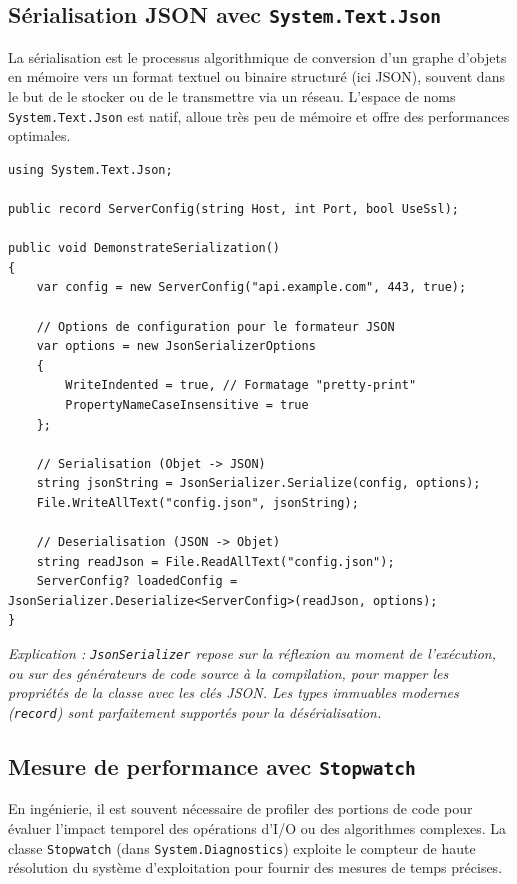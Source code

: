 \subsection{Sérialisation JSON avec \texttt{System.Text.Json}}

La sérialisation est le processus algorithmique de conversion d'un graphe d'objets en mémoire vers un format textuel ou binaire structuré (ici JSON), souvent dans le but de le stocker ou de le transmettre via un réseau. L'espace de noms \texttt{System.Text.Json} est natif, alloue très peu de mémoire et offre des performances optimales.

\begin{lstlisting}[language={[Sharp]C}]
using System.Text.Json;

public record ServerConfig(string Host, int Port, bool UseSsl);

public void DemonstrateSerialization()
{
    var config = new ServerConfig("api.example.com", 443, true);

    // Options de configuration pour le formateur JSON
    var options = new JsonSerializerOptions 
    { 
        WriteIndented = true, // Formatage "pretty-print"
        PropertyNameCaseInsensitive = true
    };

    // Serialisation (Objet -> JSON)
    string jsonString = JsonSerializer.Serialize(config, options);
    File.WriteAllText("config.json", jsonString);

    // Deserialisation (JSON -> Objet)
    string readJson = File.ReadAllText("config.json");
    ServerConfig? loadedConfig = JsonSerializer.Deserialize<ServerConfig>(readJson, options);
}
\end{lstlisting}
\textit{Explication : \texttt{JsonSerializer} repose sur la réflexion au moment de l'exécution, ou sur des générateurs de code source à la compilation, pour mapper les propriétés de la classe avec les clés JSON. Les types immuables modernes (\texttt{record}) sont parfaitement supportés pour la désérialisation.}

\subsection{Mesure de performance avec \texttt{Stopwatch}}

En ingénierie, il est souvent nécessaire de profiler des portions de code pour évaluer l'impact temporel des opérations d'I/O ou des algorithmes complexes. La classe \texttt{Stopwatch} (dans \texttt{System.Diagnostics}) exploite le compteur de haute résolution du système d'exploitation pour fournir des mesures de temps précises.

